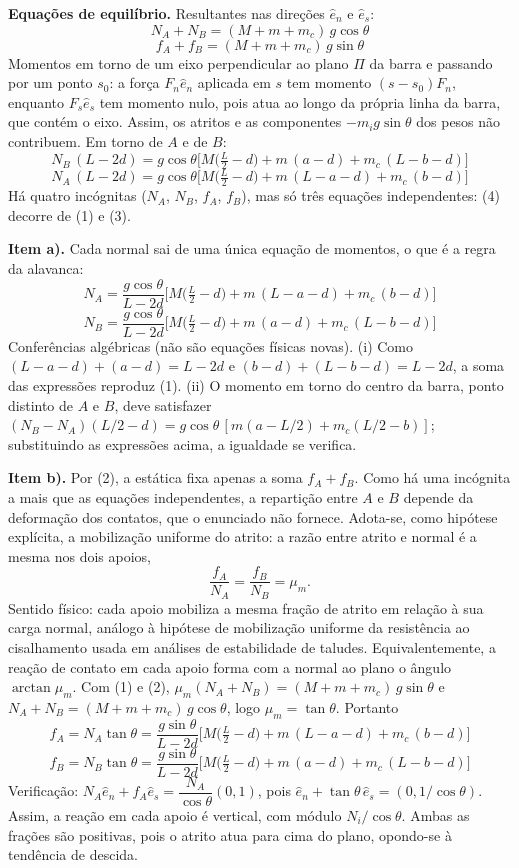 \documentclass{article}%
\begin{document}
\textbf{Equações de equilíbrio.} Resultantes nas direções $\hat e_n$ e $\hat e_s$:
\[
N_A+N_B=(M+m+m_c)\,g\cos\theta \tag{1}
\]
\[
f_A+f_B=(M+m+m_c)\,g\sin\theta \tag{2}
\]
Momentos em torno de um eixo perpendicular ao plano $\Pi$ da barra e passando por um ponto $s_0$: a força $F_n\hat e_n$ aplicada em $s$ tem momento $(s-s_0)F_n$, enquanto $F_s\hat e_s$ tem momento nulo, pois atua ao longo da própria linha da barra, que contém o eixo. Assim, os atritos e as componentes $-m_i g\sin\theta$ dos pesos não contribuem. Em torno de $A$ e de $B$:
\[
N_B\,(L-2d)=g\cos\theta\Big[M\big(\tfrac{L}{2}-d\big)+m\,(a-d)+m_c\,(L-b-d)\Big] \tag{3}
\]
\[
N_A\,(L-2d)=g\cos\theta\Big[M\big(\tfrac{L}{2}-d\big)+m\,(L-a-d)+m_c\,(b-d)\Big] \tag{4}
\]
Há quatro incógnitas ($N_A$, $N_B$, $f_A$, $f_B$), mas só três equações independentes: (4) decorre de (1) e (3).

\textbf{Item a).} Cada normal sai de uma única equação de momentos, o que é a regra da alavanca:
\[
N_A=\frac{g\cos\theta}{L-2d}\Big[M\big(\tfrac{L}{2}-d\big)+m\,(L-a-d)+m_c\,(b-d)\Big]
\]
\[
N_B=\frac{g\cos\theta}{L-2d}\Big[M\big(\tfrac{L}{2}-d\big)+m\,(a-d)+m_c\,(L-b-d)\Big]
\]
Conferências algébricas (não são equações físicas novas). (i) Como $(L-a-d)+(a-d)=L-2d$ e $(b-d)+(L-b-d)=L-2d$, a soma das expressões reproduz (1). (ii) O momento em torno do centro da barra, ponto distinto de $A$ e $B$, deve satisfazer $(N_B-N_A)(L/2-d)=g\cos\theta\,[m(a-L/2)+m_c(L/2-b)]$; substituindo as expressões acima, a igualdade se verifica.

\textbf{Item b).} Por (2), a estática fixa apenas a soma $f_A+f_B$. Como há uma incógnita a mais que as equações independentes, a repartição entre $A$ e $B$ depende da deformação dos contatos, que o enunciado não fornece. Adota-se, como hipótese explícita, a mobilização uniforme do atrito: a razão entre atrito e normal é a mesma nos dois apoios,
\[
\frac{f_A}{N_A}=\frac{f_B}{N_B}=\mu_m .
\]
Sentido físico: cada apoio mobiliza a mesma fração de atrito em relação à sua carga normal, análogo à hipótese de mobilização uniforme da resistência ao cisalhamento usada em análises de estabilidade de taludes. Equivalentemente, a reação de contato em cada apoio forma com a normal ao plano o ângulo $\arctan\mu_m$. Com (1) e (2), $\mu_m(N_A+N_B)=(M+m+m_c)\,g\sin\theta$ e $N_A+N_B=(M+m+m_c)\,g\cos\theta$, logo $\mu_m=\tan\theta$. Portanto
\[
f_A=N_A\tan\theta=\frac{g\sin\theta}{L-2d}\Big[M\big(\tfrac{L}{2}-d\big)+m\,(L-a-d)+m_c\,(b-d)\Big]
\]
\[
f_B=N_B\tan\theta=\frac{g\sin\theta}{L-2d}\Big[M\big(\tfrac{L}{2}-d\big)+m\,(a-d)+m_c\,(L-b-d)\Big]
\]
Verificação: $N_A\hat e_n+f_A\hat e_s=\dfrac{N_A}{\cos\theta}(0,1)$, pois $\hat e_n+\tan\theta\,\hat e_s=(0,1/\cos\theta)$. Assim, a reação em cada apoio é vertical, com módulo $N_i/\cos\theta$. Ambas as frações são positivas, pois o atrito atua para cima do plano, opondo-se à tendência de descida.
\end{document}
